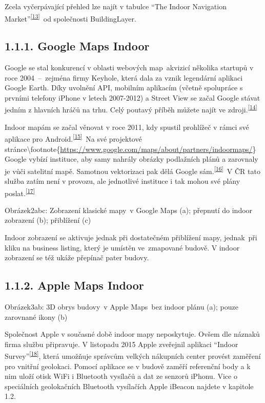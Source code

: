 Zcela vyčerpávající přehled lze najít v tabulce ``The Indoor Navigation Market''\textsuperscript{\href{}{{[}13{]}}}~od společnosti BuildingLayer.

\subsection{1.1.1. Google Maps Indoor}\label{google-maps-indoor}

Google se stal konkurencí v oblasti webových map~akvizicí několika startupů v roce 2004~--~zejména firmy Keyhole, která dala za vznik legendární aplikaci Google Earth. Díky uvolnění API, mobilním aplikacím (včetně spolupráce s prvními telefony iPhone v letech 2007-2012) a Street View se začal Google stávat jedním z hlavních hráčů na trhu. Celý poutavý příběh můžete najít ve zdroji.\textsuperscript{\href{}{{[}14{]}}}

Indoor mapám se začal věnovat v roce 2011, kdy spustil prohlížeč v rámci své aplikace pro Android.\textsuperscript{\href{}{{[}15{]}}}~Na své projektové stránce\textbackslash{}footnote\{\href{}{https://www.google.com/maps/about/partners/indoormaps/}\} Google vybízí instituce, aby samy nahrály obrázky podlažních plánů a zarovnaly je vůči satelitní mapě. Samotnou vektorizaci pak dělá Google sám.\textsuperscript{\href{}{{[}16{]}}}~V ČR tato služba zatím není v provozu, ale jednotlivé instituce i tak mohou své plány poslat.\textsuperscript{\href{}{{[}17{]}}}

Obrázek2abc: Zobrazení klasické mapy~v Google Maps (a); přepnutí do indoor zobrazení (b); přiblížení (c)

Indoor zobrazení se aktivuje jednak při dostatečném přiblížení mapy, jednak~při kliku na business listing, který je umístěn ve~zmapované budově. V indoor zobrazení se též ukáže přepínač pater budovy.

\subsection{1.1.2. Apple Maps Indoor}\label{apple-maps-indoor}

Obrázek3ab: 3D obrys budovy~v Apple Maps~bez indoor plánu (a); pouze zarovnané ikony (b)

Společnost Apple v současné době indoor mapy neposkytuje. Ovšem dle náznaků firma službu připravuje. V listopadu 2015 Apple zveřejnil aplikaci ``Indoor Survey''\textsuperscript{\href{}{{[}18{]}}}, která umožňuje správcům velkých nákupních center provést zaměření pro vnitřní geolokaci. Pomocí aplikace se v budově zaměří referenční body a k nim uloží otisk WiFi i Bluetooth vysílačů a dat ze senzorů iPhonu. Vice o speciálních geolokačních Bluetooth vysílačích Apple iBeacon najdete v kapitole 1.2.


